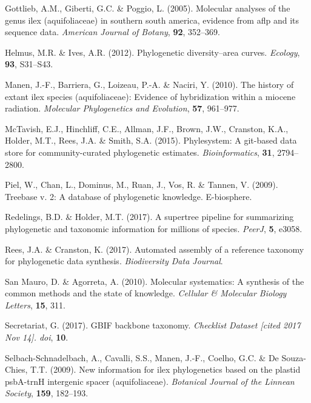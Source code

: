 \documentclass[]{article}
\begin{document}
\leavevmode\hypertarget{ref-gottlieb2005molecular}{}%
Gottlieb, A.M., Giberti, G.C. \& Poggio, L. (2005). Molecular analyses of the genus ilex (aquifoliaceae) in southern south america, evidence from aflp and its sequence data. \emph{American Journal of Botany}, \textbf{92}, 352--369.

\leavevmode\hypertarget{ref-helmus2012phylogenetic}{}%
Helmus, M.R. \& Ives, A.R. (2012). Phylogenetic diversity--area curves. \emph{Ecology}, \textbf{93}, S31--S43.

\leavevmode\hypertarget{ref-manen2010history}{}%
Manen, J.-F., Barriera, G., Loizeau, P.-A. \& Naciri, Y. (2010). The history of extant ilex species (aquifoliaceae): Evidence of hybridization within a miocene radiation. \emph{Molecular Phylogenetics and Evolution}, \textbf{57}, 961--977.

\leavevmode\hypertarget{ref-mctavish2015phylesystem}{}%
McTavish, E.J., Hinchliff, C.E., Allman, J.F., Brown, J.W., Cranston, K.A., Holder, M.T., Rees, J.A. \& Smith, S.A. (2015). Phylesystem: A git-based data store for community-curated phylogenetic estimates. \emph{Bioinformatics}, \textbf{31}, 2794--2800.

\leavevmode\hypertarget{ref-piel2009treebase}{}%
Piel, W., Chan, L., Dominus, M., Ruan, J., Vos, R. \& Tannen, V. (2009). Treebase v. 2: A database of phylogenetic knowledge. E-biosphere.

\leavevmode\hypertarget{ref-redelings2017supertree}{}%
Redelings, B.D. \& Holder, M.T. (2017). A supertree pipeline for summarizing phylogenetic and taxonomic information for millions of species. \emph{PeerJ}, \textbf{5}, e3058.

\leavevmode\hypertarget{ref-rees2017automated}{}%
Rees, J.A. \& Cranston, K. (2017). Automated assembly of a reference taxonomy for phylogenetic data synthesis. \emph{Biodiversity Data Journal}.

\leavevmode\hypertarget{ref-san2010molecular}{}%
San Mauro, D. \& Agorreta, A. (2010). Molecular systematics: A synthesis of the common methods and the state of knowledge. \emph{Cellular \& Molecular Biology Letters}, \textbf{15}, 311.

\leavevmode\hypertarget{ref-secretariat2017gbif}{}%
Secretariat, G. (2017). GBIF backbone taxonomy. \emph{Checklist Dataset {[}cited 2017 Nov 14{]}. doi}, \textbf{10}.

\leavevmode\hypertarget{ref-selbach2009new}{}%
Selbach-Schnadelbach, A., Cavalli, S.S., Manen, J.-F., Coelho, G.C. \& De Souza-Chies, T.T. (2009). New information for ilex phylogenetics based on the plastid psbA-trnH intergenic spacer (aquifoliaceae). \emph{Botanical Journal of the Linnean Society}, \textbf{159}, 182--193.
\end{document}
